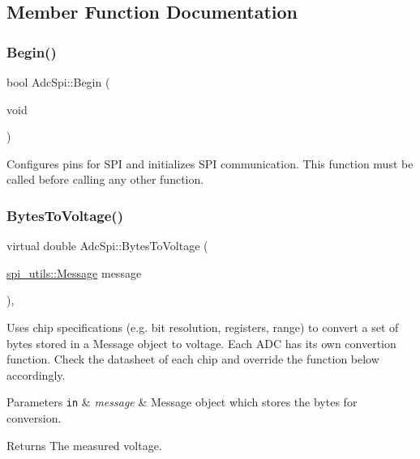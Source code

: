 \subsection{Member Function Documentation}
\mbox{\label{classAdcSpi_aa8f8f27578dd85cfcdbc9439bbce66cb}} 
\subsubsection{\texorpdfstring{Begin()}{Begin()}}
{\footnotesize\ttfamily bool Adc\+Spi\+::\+Begin (\begin{DoxyParamCaption}\item[{void}]{ }\end{DoxyParamCaption})}

Configures pins for S\+PI and initializes S\+PI communication. This function must be called before calling any other function. \mbox{\label{classAdcSpi_a25a1deb55a9f0e71a405ca47a41f3804}} 
\subsubsection{\texorpdfstring{Bytes\+To\+Voltage()}{BytesToVoltage()}}
{\footnotesize\ttfamily virtual double Adc\+Spi\+::\+Bytes\+To\+Voltage (\begin{DoxyParamCaption}\item[{\mbox{\hyperlink{structspi__utils_1_1Message}{spi\+\_\+utils\+::\+Message}}}]{message }\end{DoxyParamCaption})\hspace{0.3cm}{\ttfamily [protected]}, {}}

Uses chip specifications (e.\+g. bit resolution, registers, range) to convert a set of bytes stored in a Message object to voltage. Each A\+DC has its own convertion function. Check the datasheet of each chip and override the function below accordingly. 
\begin{DoxyParams}[1]{Parameters}
\mbox{\tt in}  & {\em message} & Message object which stores the bytes for conversion. \\
\hline
\end{DoxyParams}
\begin{DoxyReturn}{Returns}
The measured voltage. 
\end{DoxyReturn}


